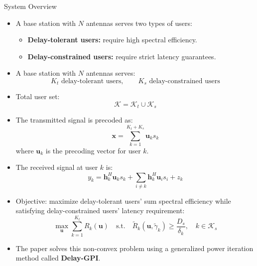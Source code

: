 \documentclass{beamer}
\begin{document}
\begin{frame}{System Overview}

\begin{itemize}
    \item A base station with $N$ antennas serves two types of users:
    \begin{itemize}
        \item \textbf{Delay-tolerant users:} require high spectral efficiency.
        \item \textbf{Delay-constrained users:} require strict latency guarantees.
    \end{itemize}

    \item A base station with $N$ antennas serves:
    \[
        K_t \text{ delay-tolerant users},
        \qquad
        K_s \text{ delay-constrained users}
    \]

    \item Total user set:
    \[
        \mathcal{K} = \mathcal{K}_t \cup \mathcal{K}_s
    \]

    \item The transmitted signal is precoded as:
    \[
        \mathbf{x} = \sum_{k=1}^{K_t+K_s} \mathbf{u}_k s_k
    \]
    where $\mathbf{u}_k$ is the precoding vector for user $k$.

    \item The received signal at user $k$ is:
    \[
        y_k = \mathbf{h}_k^H \mathbf{u}_k s_k
        + \sum_{i\neq k}\mathbf{h}_k^H \mathbf{u}_i s_i
        + z_k
    \]

    \item Objective: maximize delay-tolerant users' sum spectral efficiency while satisfying delay-constrained users' latency requirement:
    \[
        \max_{\mathbf{u}} \sum_{k=1}^{K_t} R_k(\mathbf{u})
        \quad
        \text{s.t.}
        \quad
        \tilde{R}_k(\mathbf{u},\tilde{\gamma}_k)
        \geq
        \frac{D_s}{\delta_k},
        \quad k\in \mathcal{K}_s
    \]
\end{itemize}
\end{frame}

\begin{frame}{}

\begin{itemize}
    \item The paper solves this non-convex problem using a generalized power iteration method called \textbf{Delay-GPI}.
\end{itemize}

\end{frame}
\end{document}
